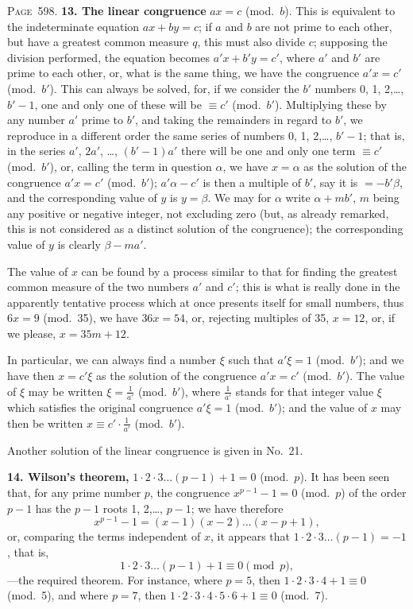 \documentclass[11pt,a4paper]{article}
\theoremstyle{definition}
\begin{document}
\newpage
\noindent\textsc{Page~598.} \textbf{13. The linear congruence} $ax=c$ (mod.\ $b$). This is equivalent to the indeterminate equation $ax+by=c$; if $a$ and $b$ are not prime to each other, but have a greatest common measure $q$, this must also divide $c$; supposing the division performed, the equation becomes $a'x+b'y=c'$, where $a'$ and $b'$ are prime to each other, or, what is the same thing, we have the congruence $a'x=c'$ (mod.\ $b'$). This can always be solved, for, if we consider the $b'$ numbers 0, 1, 2,\ldots, $b'-1$, one and only one of these will be $\equiv c'$ (mod.\ $b'$). Multiplying these by any number $a'$ prime to $b'$, and taking the remainders in regard to $b'$, we reproduce in a different order the same series of numbers 0, 1, 2,\ldots, $b'-1$; that is, in the series $a'$, $2a'$, \ldots, $(b'-1)a'$ there will be one and only one term $\equiv c'$ (mod.\ $b'$), or, calling the term in question $\alpha$, we have $x=\alpha$ as the solution of the congruence $a'x=c'$ (mod.\ $b'$); $a'\alpha-c'$ is then a multiple of $b'$, say it is $=-b'\beta$, and the corresponding value of $y$ is $y=\beta$. We may for $\alpha$ write $\alpha+mb'$, $m$ being any positive or negative integer, not excluding zero (but, as already remarked, this is not considered as a distinct solution of the congruence); the corresponding value of $y$ is clearly $\beta-ma'$.

The value of $x$ can be found by a process similar to that for finding the greatest common measure of the two numbers $a'$ and $c'$; this is what is really done in the apparently tentative process which at once presents itself for small numbers, thus $6x=9$ (mod.\ 35), we have $36x=54$, or, rejecting multiples of 35, $x=12$, or, if we please, $x=35m+12$.

In particular, we can always find a number $\xi$ such that $a'\xi=1$ (mod.\ $b'$); and we have then $x=c'\xi$ as the solution of the congruence $a'x=c'$ (mod.\ $b'$). The value of $\xi$ may be written $\xi=\frac{1}{a'}$ (mod.\ $b'$), where $\frac{1}{a'}$ stands for that integer value $\xi$ which satisfies the original congruence $a'\xi=1$ (mod.\ $b'$); and the value of $x$ may then be written $x\equiv c'\cdot\frac{1}{a'}$ (mod.\ $b'$).

Another solution of the linear congruence is given in No.~21.

\textbf{14. Wilson's theorem,} $1\cdot2\cdot3\ldots(p-1)+1=0$ (mod.\ $p$). It has been seen that, for any prime number $p$, the congruence $x^{p-1}-1=0$ (mod.\ $p$) of the order $p-1$ has the $p-1$ roots 1, 2,\ldots, $p-1$; we have therefore
\[
x^{p-1}-1=(x-1)(x-2)\ldots(x-p+1),
\]
or, comparing the terms independent of $x$, it appears that $1\cdot2\cdot3\ldots(p-1)=-1$, that is,
\[
1\cdot2\cdot3\ldots(p-1)+1\equiv0\pmod{p},
\]
---the required theorem. For instance, where $p=5$, then $1\cdot2\cdot3\cdot4+1\equiv0$ (mod.\ 5), and where $p=7$, then $1\cdot2\cdot3\cdot4\cdot5\cdot6+1\equiv0$ (mod.\ 7).
\end{document}
